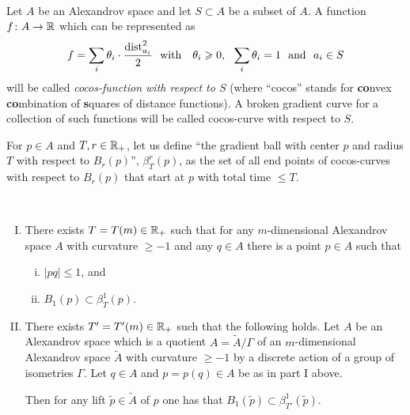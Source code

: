\documentclass{amsart}
\begin{document}
\

Let $A$ be an Alexandrov space and let $S\subset A$ be a subset of $A$. A function $f\colon A\to {\Bbb R}$  which can be represented as
$$f=\sum_i \theta_i\cdot \frac{\operatorname{\rm dist}^2_{a_i}}{2}\ \ \text{with }\ \  \theta_i\geqslant 0,\ \  \sum_i \theta_i=1\ \ \text{and}\ \ a_i\in S$$
will be called {\sl cocos-function with respect to $S$}
(where ``cocos'' stands for
{\bf co}nvex {\bf co}mbination of {\bf s}quares of distance functions).
A broken gradient curve for a collection of such functions
will be called cocos-curve with respect to $S$.

For $p\in A$ and $T,r\in {\Bbb R}_+$,
let us define  ``the gradient ball with center $p$
and radius $T$ with respect to $B_r(p)$'', $\beta^r_T(p)$,
as the set of all end points of cocos-curves with respect to $B_r(p)$
that start at $p$
with total time $\le T$.

\begin{lem}\label{lem:gradb}\

\begin{enumerate}[(I)]
\item There exists $T=T(m)\in {\Bbb R}_+$
such that for any $m$-dimensional Alexandrov space $A$ with curvature $\ge -1$ and any $q\in A$ there is a point $p\in A$
such that
\begin{enumerate}[(i)]
\item $|pq|\le 1$, and
\item $B_1(p)\subset \beta^{1}_T(p)$.
\end{enumerate}
\item There exists $T'=T'(m)\in {\Bbb R}_+$
such that the following holds.
Let $A$ be an Alexandrov space
which is a quotient $A=\tilde A/\Gamma$
of an  $m$-dimensional Alexandrov space $\tilde A$ with curvature $\ge -1$
by a discrete action of a group of isometries $\Gamma$.
Let $q\in A$ and $p=p(q)\in A$
be as in part I above.

Then
for any lift $\tilde p \in \tilde A$ of $p$ one has that
$B_1(\tilde p)\subset \beta^{1}_{T'}(\tilde p)$.
\end{enumerate}
\end{lem}
\end{document}
